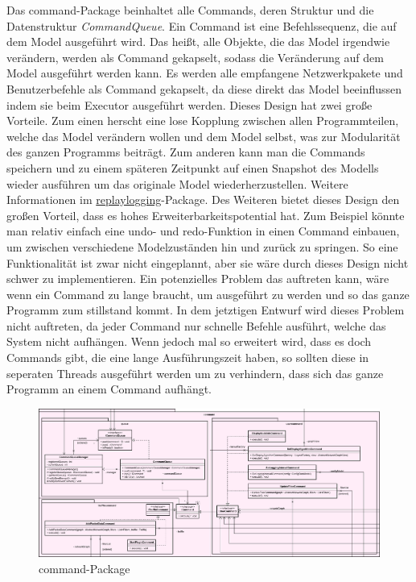 Das command-Package beinhaltet alle Commands, deren Struktur und die Datenstruktur
\textit{CommandQueue}. Ein Command ist eine Befehlssequenz, die auf
dem Model ausgeführt wird. Das heißt, alle Objekte, die das Model irgendwie verändern,
werden als Command gekapselt, sodass die Veränderung auf dem Model
ausgeführt werden kann. Es werden alle empfangene Netzwerkpakete
und Benutzerbefehle als Command gekapselt, da diese direkt das Model beeinflussen
indem sie beim Executor ausgeführt werden.
\newline
\newline
Dieses Design hat zwei große Vorteile. Zum einen herscht eine lose Kopplung zwischen
allen Programmteilen, welche das Model verändern wollen und dem Model selbst, was zur Modularität des ganzen
Programms beiträgt. Zum anderen kann man die Commands speichern und zu einem
späteren Zeitpunkt auf einen Snapshot des Modells wieder ausführen um das originale
Model wiederherzustellen. Weitere Informationen im
\hyperref[subsubsec:replaylogging]{replaylogging}-Package. Des Weiteren bietet dieses
Design den großen Vorteil, dass es hohes Erweiterbarkeitspotential hat. Zum Beispiel
könnte man relativ einfach eine undo- und redo-Funktion in einen Command einbauen, um
zwischen verschiedene Modelzuständen hin und zurück zu springen. So eine
Funktionalität ist zwar nicht eingeplannt, aber sie wäre durch dieses Design nicht schwer zu implementieren.
\newline
\newline
Ein potenzielles Problem das auftreten kann, wäre wenn ein Command zu lange braucht, um
ausgeführt zu werden und so das ganze Programm zum stillstand kommt.
In dem jetztigen Entwurf wird dieses Problem nicht auftreten, da jeder Command
nur schnelle Befehle ausführt, welche das System nicht
aufhängen. Wenn jedoch \programname mal so erweitert wird, dass es doch Commands gibt,
die eine lange Ausführungszeit haben, so sollten diese in seperaten Threads
ausgeführt werden um zu verhindern, dass sich das ganze Programm an einem Command
aufhängt.

\begin{figure}[H]
  \centering
  \includegraphics[width=\textwidth]{../diagramimages/command.png}
  \caption{command-Package}
\end{figure}

